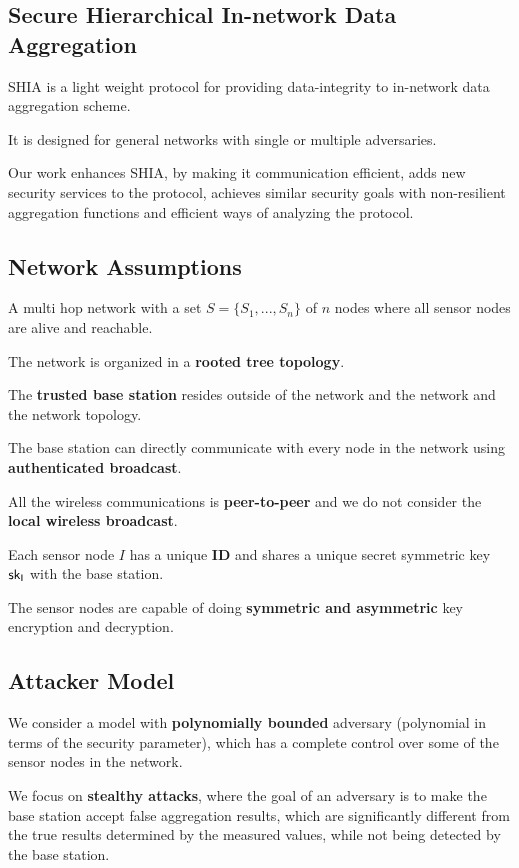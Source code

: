 \documentclass[%
  slidesonly,%
  semlayer%
  ]{seminar}                                  %
\begin{document}
\begin{slide}
\section*{Secure Hierarchical In-network Data Aggregation}
    \vfill
    SHIA is a light weight protocol for providing data-integrity to in-network data aggregation scheme.
    
    It is designed for general networks with single or multiple adversaries.
    
    Our work enhances SHIA, by making it communication efficient, adds new security services to the protocol, achieves similar security goals with non-resilient aggregation functions and efficient ways of analyzing the protocol.
    \vfill
    \clearpage

    \subsection*{Network Assumptions}
      \vfill
      A multi hop network with a set $ S = \{S_{1},...,S_{n}\} $ of $n$ nodes where all sensor nodes are alive and reachable. 

      The network is organized in a \textbf{rooted tree topology}.

      The \textbf{trusted base station} resides outside of the network and the network and the network topology. 

      The base station can directly communicate with every node in the network using \textbf{authenticated broadcast}.

      All the wireless communications is \textbf{peer-to-peer} and we do not consider the \textbf{local wireless broadcast}.

      Each sensor node $I$ has a unique \textbf{ID} and shares a unique secret symmetric key $\sf{sk}_{I}$ with the base station.

      The sensor nodes are capable of doing \textbf{symmetric and asymmetric} key encryption and decryption.
      \vfill
      \clearpage

    \subsection*{Attacker Model}
      \vfill
      We consider a model with \textbf{polynomially bounded} adversary (polynomial in terms of the security parameter), which has a complete control over some of the sensor nodes in the network.
   
      We focus on \textbf{stealthy attacks}, where the goal of an adversary is to make the base station accept false aggregation  results, which are significantly different from the true results determined by the measured values, while not being detected by the base station.
      

\end{slide}
\end{document}
